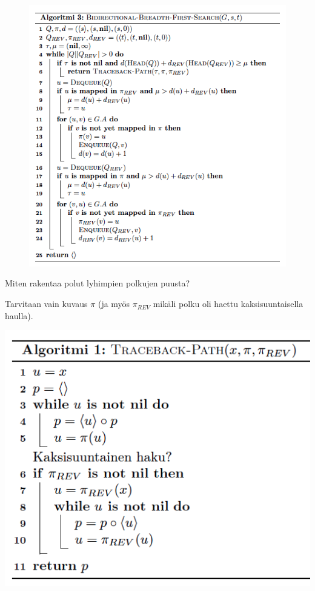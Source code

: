 \documentclass{beamer}
\begin{document}
\begin{frame}
\begin{figure}[H]
  \includegraphics[width=\textwidth,height=\textheight,keepaspectratio]{bibfs}
\end{figure}
\end{frame}

\begin{frame}
Miten rakentaa polut lyhimpien polkujen puusta?
\end{frame}

\begin{frame}
Tarvitaan vain kuvaus $\pi$ (ja myös $\pi_{REV}$ mikäli polku oli haettu kaksisuuntaisella haulla).
\end{frame}

\begin{frame}
  \includegraphics[width=\textwidth,height=\textheight,keepaspectratio]{path}
\end{frame}
\end{document}
